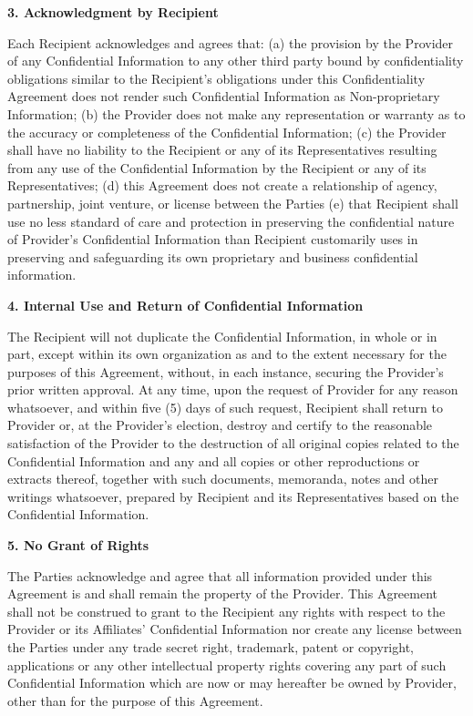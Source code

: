 \documentclass[11pt,a4paper]{article} %
\begin{document}
\textbf{3. Acknowledgment by Recipient}

Each Recipient acknowledges and agrees that: (a) the provision by the
Provider of any Confidential Information to any other third party bound
by confidentiality obligations similar to the Recipient's obligations
under this Confidentiality Agreement does not render such Confidential
Information as Non-proprietary Information; (b) the Provider does not
make any representation or warranty as to the accuracy or completeness
of the Confidential Information; (c) the Provider shall have no
liability to the Recipient or any of its Representatives resulting from
any use of the Confidential Information by the Recipient or any of its
Representatives; (d) this Agreement does not create a relationship of
agency, partnership, joint venture, or license between the Parties (e)
that Recipient shall use no less standard of care and protection in
preserving the confidential nature of Provider's Confidential
Information than Recipient customarily uses in preserving and
safeguarding its own proprietary and business confidential information.

\textbf{4. Internal Use and Return of Confidential Information}

The Recipient will not duplicate the Confidential Information, in whole
or in part, except within its own organization as and to the extent
necessary for the purposes of this Agreement, without, in each instance,
securing the Provider's prior written approval. At any time, upon the
request of Provider for any reason whatsoever, and within five (5) days
of such request, Recipient shall return to Provider or, at the
Provider's election, destroy and certify to the reasonable satisfaction
of the Provider to the destruction of all original copies related to the
Confidential Information and any and all copies or other reproductions
or extracts thereof, together with such documents, memoranda, notes and
other writings whatsoever, prepared by Recipient and its Representatives
based on the Confidential Information.

\textbf{5. No Grant of Rights}

The Parties acknowledge and agree that all information provided under
this Agreement is and shall remain the property of the Provider. This
Agreement shall not be construed to grant to the Recipient any rights
with respect to the Provider or its Affiliates' Confidential Information
nor create any license between the Parties under any trade secret right,
trademark, patent or copyright, applications or any other intellectual
property rights covering any part of such Confidential Information which
are now or may hereafter be owned by Provider, other than for the
purpose of this Agreement.
\end{document}
